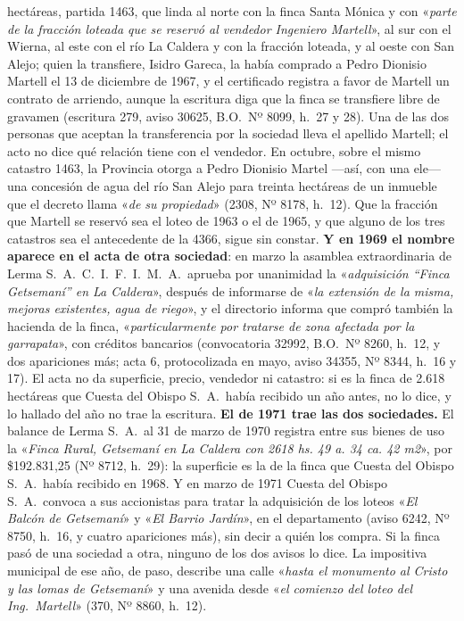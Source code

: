 \begin{cautela}
hectáreas, partida 1463, que linda al norte con la finca Santa Mónica y con «\textit{parte de la fracción loteada que se reservó al vendedor Ingeniero Martell}», al sur con el Wierna, al este con el río La Caldera y con la fracción loteada, y al oeste con San Alejo; quien la transfiere, Isidro Gareca, la había comprado a Pedro Dionisio Martell el 13 de diciembre de 1967, y el certificado registra a favor de Martell un contrato de arriendo, aunque la escritura diga que la finca se transfiere libre de gravamen (escritura 279, aviso 30625, B.O.\ Nº 8099, h.\ 27 y 28). Una de las dos personas que aceptan la transferencia por la sociedad lleva el apellido Martell; el acto no dice qué relación tiene con el vendedor. En octubre, sobre el mismo catastro 1463, la Provincia otorga a Pedro Dionisio Martel ---así, con una ele--- una concesión de agua del río San Alejo para treinta hectáreas de un inmueble que el decreto llama «\textit{de su propiedad}» (2308, Nº 8178, h.\ 12). Que la fracción que Martell se reservó sea el loteo de 1963 o el de 1965, y que alguno de los tres catastros sea el antecedente de la 4366, sigue sin constar. \textbf{Y en 1969 el nombre aparece en el acta de otra sociedad}: en marzo la asamblea extraordinaria de Lerma S.\ A.\ C.\ I.\ F.\ I.\ M.\ A.\ aprueba por unanimidad la «\textit{adquisición ``Finca Getsemaní'' en La Caldera}», después de informarse de «\textit{la extensión de la misma, mejoras existentes, agua de riego}», y el directorio informa que compró también la hacienda de la finca, «\textit{particularmente por tratarse de zona afectada por la garrapata}», con créditos bancarios (convocatoria 32992, B.O.\ Nº 8260, h.\ 12, y dos apariciones más; acta 6, protocolizada en mayo, aviso 34355, Nº 8344, h.\ 16 y 17). El acta no da superficie, precio, vendedor ni catastro: si es la finca de 2.618 hectáreas que Cuesta del Obispo S.\ A.\ había recibido un año antes, no lo dice, y lo hallado del año no trae la escritura. \textbf{El de 1971 trae las dos sociedades.} El balance de Lerma S.\ A.\ al 31 de marzo de 1970 registra entre sus bienes de uso la «\textit{Finca Rural, Getsemaní en La Caldera con 2618 hs. 49 a. 34 ca. 42 m2}», por \$192.831,25 (Nº 8712, h.\ 29): la superficie es la de la finca que Cuesta del Obispo S.\ A.\ había recibido en 1968. Y en marzo de 1971 Cuesta del Obispo S.\ A.\ convoca a sus accionistas para tratar la adquisición de los loteos «\textit{El Balcón de Getsemaní}» y «\textit{El Barrio Jardín}», en el departamento (aviso 6242, Nº 8750, h.\ 16, y cuatro apariciones más), sin decir a quién los compra. Si la finca pasó de una sociedad a otra, ninguno de los dos avisos lo dice. La impositiva municipal de ese año, de paso, describe una calle «\textit{hasta el monumento al Cristo y las lomas de Getsemaní}» y una avenida desde «\textit{el comienzo del loteo del Ing.\ Martell}» (370, Nº 8860, h.\ 12).


\end{cautela}
